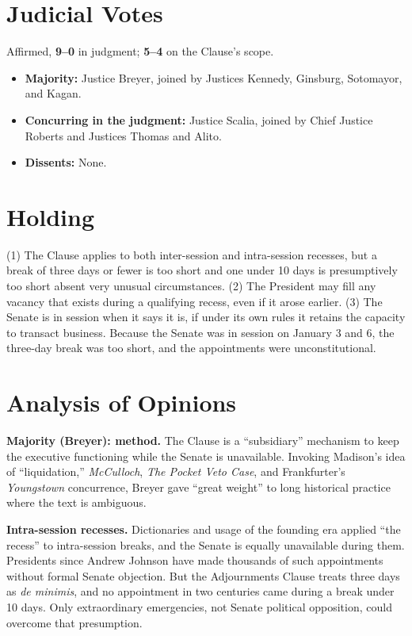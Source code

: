 \documentclass[12pt]{article}
\begin{document}
\section{Judicial Votes}

Affirmed, \textbf{9--0} in judgment; \textbf{5--4} on the Clause's scope.
\begin{itemize}
\item \textbf{Majority:} Justice Breyer, joined by Justices Kennedy, Ginsburg, Sotomayor, and Kagan.
\item \textbf{Concurring in the judgment:} Justice Scalia, joined by Chief Justice Roberts and Justices Thomas and Alito.
\item \textbf{Dissents:} None.
\end{itemize}

\section{Holding}

(1) The Clause applies to both inter-session and intra-session recesses, but a break of three days or fewer is too short and one under 10 days is presumptively too short absent very unusual circumstances. (2) The President may fill any vacancy that exists during a qualifying recess, even if it arose earlier. (3) The Senate is in session when it says it is, if under its own rules it retains the capacity to transact business. Because the Senate was in session on January 3 and 6, the three-day break was too short, and the appointments were unconstitutional.

\section{Analysis of Opinions}

\textbf{Majority (Breyer): method.} The Clause is a ``subsidiary'' mechanism to keep the executive functioning while the Senate is unavailable. Invoking Madison's idea of ``liquidation,'' \textit{McCulloch}, \textit{The Pocket Veto Case}, and Frankfurter's \textit{Youngstown} concurrence, Breyer gave ``great weight'' to long historical practice where the text is ambiguous.

\textbf{Intra-session recesses.} Dictionaries and usage of the founding era applied ``the recess'' to intra-session breaks, and the Senate is equally unavailable during them. Presidents since Andrew Johnson have made thousands of such appointments without formal Senate objection. But the Adjournments Clause treats three days as \emph{de minimis}, and no appointment in two centuries came during a break under 10 days. Only extraordinary emergencies, not Senate political opposition, could overcome that presumption.
\end{document}

